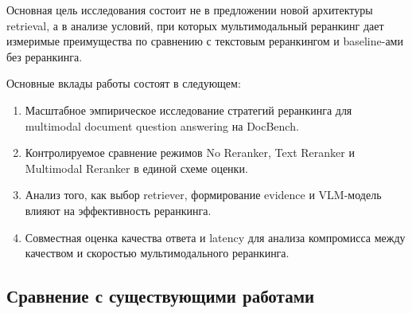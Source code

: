 \documentclass[conference]{IEEEtran}
\begin{document}
Основная цель исследования состоит не в предложении новой архитектуры retrieval, а в анализе условий, при которых мультимодальный реранкинг дает измеримые преимущества по сравнению с текстовым реранкингом и baseline-ами без реранкинга.

Основные вклады работы состоят в следующем:

\begin{enumerate}
\item Масштабное эмпирическое исследование стратегий реранкинга для multimodal document question answering на DocBench.
\item Контролируемое сравнение режимов No Reranker, Text Reranker и Multimodal Reranker в единой схеме оценки.
\item Анализ того, как выбор retriever, формирование evidence и VLM-модель влияют на эффективность реранкинга.
\item Совместная оценка качества ответа и latency для анализа компромисса между качеством и скоростью мультимодального реранкинга.
\end{enumerate}


\subsection{Сравнение с существующими работами}
\end{document}
